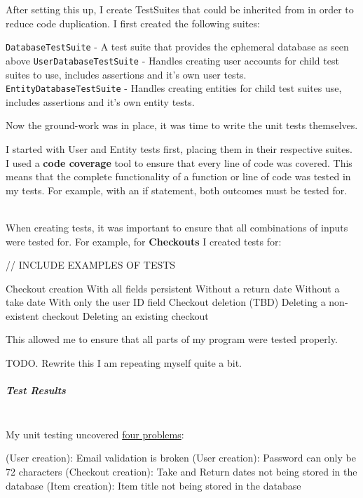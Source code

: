 \documentclass[../../main.tex]{subfiles}
\begin{document}
\noindent After setting this up, I create TestSuites that could be inherited from in order to reduce code duplication. I first created the following suites:

\begin{outline}
    \1 \lstinline{DatabaseTestSuite} - A test suite that provides the ephemeral database as seen above
    \2 \lstinline{UserDatabaseTestSuite} - Handles creating user accounts for child test suites to use, includes assertions and it's own user tests.
    \2 \lstinline{EntityDatabaseTestSuite} - Handles creating entities for child test suites use, includes assertions and it's own entity tests.
\end{outline}

\noindent Now the ground-work was in place, it was time to write the unit tests themselves.

\noindent I started with User and Entity tests first, placing them in their respective suites.
I used a \textbf{code coverage} tool to ensure that every line of code was covered.
This means that the complete functionality of a function or line of code was tested in my tests.
For example, with an if statement, both outcomes must be tested for.

\noindent \\ When creating tests, it was important to ensure that all combinations of inputs were tested for.
For example, for \textbf{Checkouts} I created tests for:

// INCLUDE EXAMPLES OF TESTS

\begin{outline}
    \1 Checkout creation
    \2 With all fields persistent
    \2 Without a return date
    \2 Without a take date
    \2 With only the user ID field
    \1 Checkout deletion (TBD)
    \2 Deleting a non-existent checkout
    \2 Deleting an existing checkout
\end{outline}

\noindent This allowed me to ensure that all parts of my program were tested properly.

\noindent TODO. Rewrite this I am repeating myself quite a bit.


\subparagraph{Test Results}

\noindent \\ My unit testing uncovered \underline{four problems}:

\begin{outline}
    \1 (User creation): Email validation is broken
    \1 (User creation): Password can only be 72 characters
    \1 (Checkout creation): Take and Return dates not being stored in the database
    \1 (Item creation): Item title not being stored in the database
\end{outline}
\end{document}
